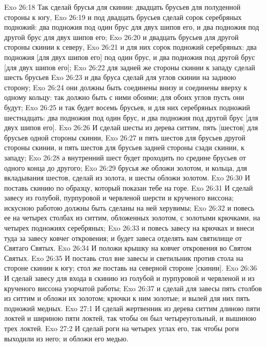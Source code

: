 \vs Exo 26:18 Так сделай брусья для скинии: двадцать брусьев для полуденной стороны к югу,
\vs Exo 26:19 и под двадцать брусьев сделай сорок серебряных подножий: два подножия под один брус для двух шипов его, и два подножия под другой брус для двух шипов его;
\vs Exo 26:20 и двадцать брусьев для другой стороны скинии к северу,
\vs Exo 26:21 и для них сорок подножий серебряных: два подножия [для двух шипов его] под один брус, и два подножия под другой брус [для двух шипов его];
\vs Exo 26:22 для задней же стороны скинии к западу сделай шесть брусьев
\vs Exo 26:23 и два бруса сделай для углов скинии на заднюю сторону;
\vs Exo 26:24 они должны быть соединены внизу и соединены вверху к одному кольцу: так должно быть с ними обоими; для обоих углов пусть они будут;
\vs Exo 26:25 и так будет восемь брусьев, и для них серебряных подножий шестнадцать: два подножия под один брус, и два подножия под другой брус [для двух шипов его].
\vs Exo 26:26 И сделай шесты из дерева ситтим, пять [шестов] для брусьев одной стороны скинии,
\vs Exo 26:27 и пять шестов для брусьев другой стороны скинии, и пять шестов для брусьев задней стороны сзади скинии, к западу;
\vs Exo 26:28 а внутренний шест будет проходить по средине брусьев от одного конца до другого;
\vs Exo 26:29 брусья же обложи золотом, и кольца, для вкладывания шестов, сделай из золота, и шесты обложи золотом.
\vs Exo 26:30 И поставь скинию по образцу, который показан тебе на горе.
\rsbpar\vs Exo 26:31 И сделай завесу из голубой, пурпуровой и червленой шерсти и крученого виссона; искусною работою должны быть сделаны на ней херувимы;
\vs Exo 26:32 и повесь ее на четырех столбах из ситтим, обложенных золотом, с золотыми крючками, на четырех подножиях серебряных;
\vs Exo 26:33 и повесь завесу на крючках и внеси туда за завесу ковчег откровения; и будет завеса отделять вам святилище от Святаго Святых.
\vs Exo 26:34 И положи крышку на ковчег откровения во Святом Святых.
\vs Exo 26:35 И поставь стол вне завесы и светильник против стола на стороне скинии к югу; стол же поставь на северной стороне [скинии].
\vs Exo 26:36 И сделай завесу для входа в скинию из голубой и пурпуровой и червленой  и из крученого виссона узорчатой работы;
\vs Exo 26:37 и сделай для завесы пять столбов из ситтим и обложи их золотом; крючки к ним золотые; и вылей для них пять подножий медных.
\vs Exo 27:1 И сделай жертвенник из дерева ситтим длиною пяти локтей и шириною пяти локтей, так чтобы он был четыреугольный, и вышиною трех локтей.
\vs Exo 27:2 И сделай роги на четырех углах его, так чтобы роги выходили из него; и обложи его медью.
